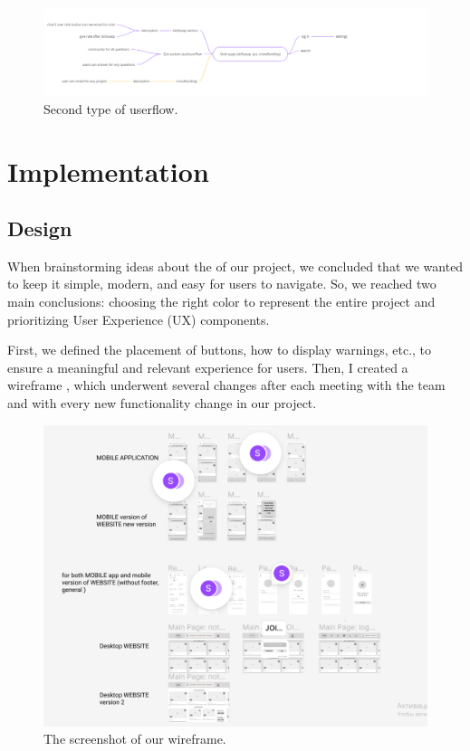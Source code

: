 \begin{figure}[ht]\label{fig:userflow2}
  \centering
  \includegraphics[width=0.8\linewidth]{figures/Userflow -2.png}
  \caption{Second type of userflow.}
\end{figure}

\newpage
\section{Implementation}\label{impl}
\subsection{Design}\label{des}
When brainstorming ideas about the  of our project, we concluded that we wanted to keep it simple, modern, and easy for users to navigate. So, we reached two main conclusions: choosing the right color to represent the entire project and prioritizing User Experience (UX) \cite{design} components.

First, we defined the placement of buttons, how to display warnings, etc., to ensure a meaningful and relevant experience for users. Then, I created a wireframe \cite{wireframe}, which underwent several changes after each meeting with the team and with every new functionality change in our project.

\begin{figure}[ht]\label{fig:wireframe}
  \centering
  \includegraphics[width=0.8\linewidth]{figures/wireframe.png}
  \caption{The screenshot of our wireframe.}
\end{figure}

